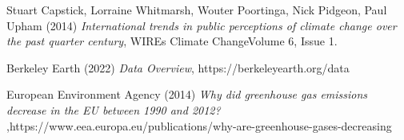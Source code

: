 \begin{thebibliography}{9}

Stuart Capstick, Lorraine Whitmarsh, Wouter Poortinga, Nick Pidgeon, Paul Upham (2014) \emph{International trends in public perceptions of climate change over the past quarter century}, WIREs Climate ChangeVolume 6, Issue 1.

Berkeley Earth (2022) \emph{Data Overview}, https://berkeleyearth.org/data

European Environment Agency (2014) \emph{Why did greenhouse gas emissions decrease in the EU between 1990 and 2012?} ,https://www.eea.europa.eu/publications/why-are-greenhouse-gases-decreasing

\end{thebibliography}
